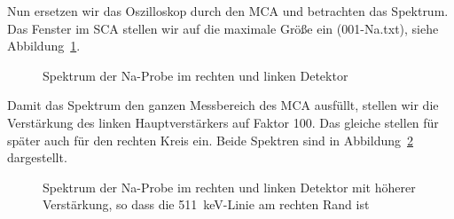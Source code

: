 Nun ersetzen wir das Oszilloskop durch den MCA und betrachten das Spektrum. Das
Fenster im SCA stellen wir auf die maximale Größe ein (001-Na.txt), siehe
Abbildung~\ref{mca:001_004}.

\begin{figure}[htbp]
    \centering
    \hfill
    \label{mca:001_004}
    \caption{Spektrum der Na-Probe im rechten und linken Detektor}
\end{figure}

Damit das Spektrum den ganzen Messbereich des MCA ausfüllt, stellen wir die
Verstärkung des linken Hauptverstärkers auf Faktor 100. Das gleiche stellen für
später auch für den rechten Kreis ein. Beide Spektren sind in
Abbildung~\ref{mca:003_005} dargestellt.

\begin{figure}[htbp]
    \centering
    \hfill
    \label{mca:003_005}
    \caption{%
        Spektrum der Na-Probe im rechten und linken Detektor mit höherer
        Verstärkung, so dass die \SI{511}{\kilo\electronvolt}-Linie am rechten
        Rand ist
    }
\end{figure}

